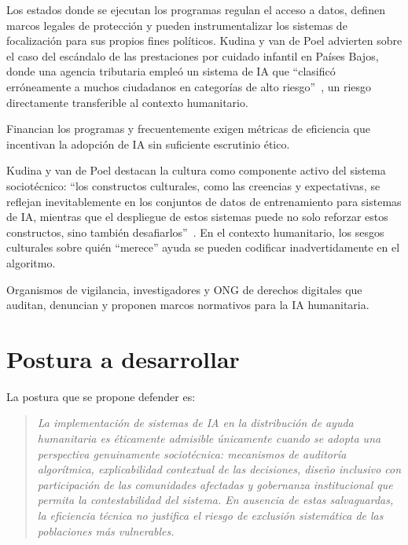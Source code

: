 \documentclass[12pt, a4paper]{article}
\begin{document}
\begin{description}[leftmargin=2em, style=nextline]
    \item[\textbf{Gobiernos anfitriones (instituciones formales)}]
    Los estados donde se ejecutan los programas regulan el acceso a datos, definen marcos legales de protección y pueden instrumentalizar los sistemas de focalización para sus propios fines políticos. Kudina y van de Poel advierten sobre el caso del escándalo de las prestaciones por cuidado infantil en Países Bajos, donde una agencia tributaria empleó un sistema de IA que ``clasificó erróneamente a muchos ciudadanos en categorías de alto riesgo''~\cite{kudina2024sociotechnical}, un riesgo directamente transferible al contexto humanitario.

    \item[\textbf{Donantes internacionales (instituciones formales: financiadores)}]
    Financian los programas y frecuentemente exigen métricas de eficiencia que incentivan la adopción de IA sin suficiente escrutinio ético.

    \item[\textbf{Cultura y contexto social (instituciones informales)}]
    Kudina y van de Poel destacan la cultura como componente activo del sistema sociotécnico: ``los constructos culturales, como las creencias y expectativas, se reflejan inevitablemente en los conjuntos de datos de entrenamiento para sistemas de IA, mientras que el despliegue de estos sistemas puede no solo reforzar estos constructos, sino también desafiarlos''~\cite{kudina2024sociotechnical}. En el contexto humanitario, los sesgos culturales sobre quién ``merece'' ayuda se pueden codificar inadvertidamente en el algoritmo.

    \item[\textbf{Comunidad académica y sociedad civil (agentes humanos: vigilancia)}]
    Organismos de vigilancia, investigadores y ONG de derechos digitales que auditan, denuncian y proponen marcos normativos para la IA humanitaria.
\end{description}

\section{Postura a desarrollar}

La postura que se propone defender es:

\begin{quote}
\textit{La implementación de sistemas de IA en la distribución de ayuda humanitaria es éticamente admisible únicamente cuando se adopta una perspectiva genuinamente sociotécnica: mecanismos de auditoría algorítmica, explicabilidad contextual de las decisiones, diseño inclusivo con participación de las comunidades afectadas y gobernanza institucional que permita la contestabilidad del sistema. En ausencia de estas salvaguardas, la eficiencia técnica no justifica el riesgo de exclusión sistemática de las poblaciones más vulnerables.}
\end{quote}
\end{document}
